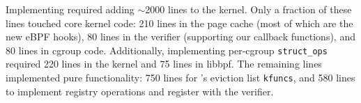 Implementing \name required adding $\sim$2000 lines to the kernel. Only a fraction of these lines touched core kernel code: 210 lines in the page cache (most of which are the new eBPF hooks), 80 lines in the verifier (supporting our callback functions), and 80 lines in cgroup code. Additionally, implementing per-cgroup \texttt{struct\_ops} required 220 lines in the kernel and 75 lines in libbpf. The remaining lines implemented pure \name functionality: 750 lines for \name's eviction list \texttt{kfuncs}, and 580 lines to implement registry operations and register \name with the verifier.
